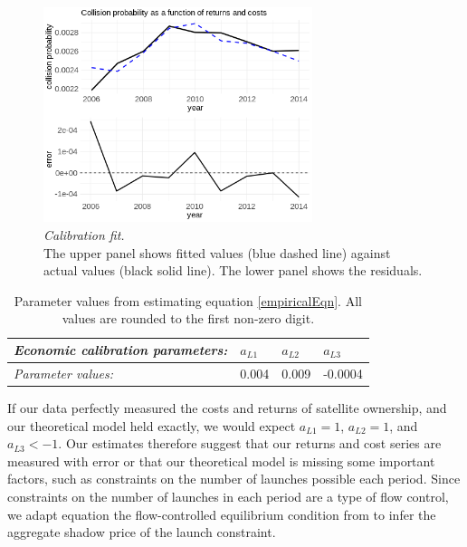 \documentclass[12pt]{article}
\begin{document}
\begin{figure}
	\centering
	\includegraphics[width=0.7\textwidth]{../../images/risk_return_plot.png}
	\captionsetup{format=hang}
	\caption[Open access equilibrium condition model fit]{\textit{Calibration fit.} \\
		The upper panel shows fitted values (blue dashed line) against actual values (black solid line). The lower panel shows the residuals.
	}
	\label{econCalibration}
\end{figure}


\begin{table}[H]
	\centering
	\begin{tabular}{|l|l|l|l|}
		\hline
		\textit{Economic calibration parameters:}      & \textbf{$a_{L 1}$} & \textbf{$a_{L 2}$} & \textbf{$a_{L 3}$} \\ \hline
		\textit{Parameter values:} & 0.004               & 0.009               & -0.0004 \\ \hline
	\end{tabular}
	\caption[Parameter values from estimating equation \ref{empiricalEqn}]{Parameter values from estimating equation \ref{empiricalEqn}. All values are rounded to the first non-zero digit.}
	\label{econParms}
\end{table}

If our data perfectly measured the costs and returns of satellite ownership, and our theoretical model held exactly, we would expect $a_{L 1}=1$, $a_{L 2} = 1$, and $a_{L 3} < -1$. Our estimates therefore suggest that our returns and cost series are measured with error or that our theoretical model is missing some important factors, such as constraints on the number of launches possible each period. Since constraints on the number of launches in each period are a type of flow control, we adapt equation the flow-controlled equilibrium condition from \cite{raoJMP} to infer the aggregate shadow price of the launch constraint. \\
\end{document}

